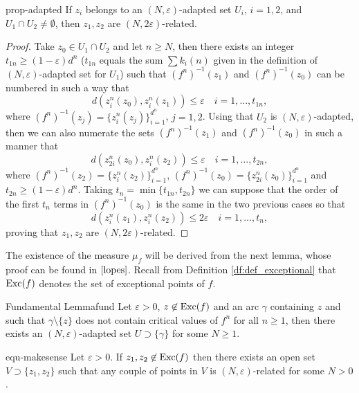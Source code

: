 \begin{myprop}{}{prop-adapted}
If $z_i$ belongs to an $(N,\varepsilon)$-adapted set $U_i$, $i=1,2$, and $U_1\cap U_2 \neq \emptyset$, then $z_1,z_2$ are $(N,2\varepsilon)$-related. 
\end{myprop}

\begin{proof}
Take $z_0 \in U_1\cap U_2$ and let $n\geq N$, then there exists an integer $t_{1n}\geq (1-\varepsilon)d^n$ ($t_{1n}$ equals the sum $\sum k_i(n)$ given in the definition of $(N,\varepsilon)$-adapted set for $U_1$) such that $(f^{n})^{-1}(z_1)$ and $(f^n)^{-1}(z_0)$ can be numbered in such a way that
$$d(z_i^n(z_0),z_i^n(z_1)) \leq \varepsilon \quad i=1,\dots,t_{1n},$$
where $(f^{n})^{-1}(z_j) = \{z_i^n(z_j)\}_{i=1}^{d^n}$, $j=1,2$. Using that $U_2$ is $(N,\varepsilon)$-adapted, then we can also numerate the sets $(f^{n})^{-1}(z_1)$ and $(f^n)^{-1}(z_0)$ in such a manner that
$$d(z_{2i}^n(z_0),z_i^n(z_2)) \leq \varepsilon \quad i=1,\dots,t_{2n},$$
where $(f^{n})^{-1}(z_2) = \{z_i^n(z_2)\}_{i=1}^{d^n}$, $(f^{n})^{-1}(z_0) = \{z_{2i}^n(z_0)\}_{i=1}^{d^n}$ and $t_{2n}\geq (1-\varepsilon)d^n$. Taking $t_n = \min\{t_{1n},t_{2n}\}$ we can suppose that the order of the first $t_n$ terms in $(f^n)^{-1}(z_0)$ is the same in the two previous cases so that
$$d(z_i^n(z_1),z_i^n(z_2)) \leq 2\varepsilon \quad i=1,\dots,t_{n},$$
proving that $z_1,z_2$ are $(N,2\varepsilon)$-related. 
\end{proof}

The existence of the measure $\mu_f$ will be derived from the next lemma, whose proof can be found in $\cite{lopes}$. Recall from Definition \ref{df:def_exceptional} that $\text{Exc}(f)$ denotes the set of exceptional points of $f$.

\begin{mylema}{Fundamental Lemma}{fund}
Let $\varepsilon>0$, $z\not \in \text{Exc}(f)$ and an arc $\gamma$ containing $z$ and such that $\gamma\setminus \{z\}$ does not contain critical values of $f^n$ for all $n\geq 1$, then there exists an $(N,\varepsilon)$-adapted set $U\supset \{\gamma\}$ for some $N\geq 1$.
\end{mylema}

\begin{mycoro}{}{equ-makesense}
Let $\varepsilon>0$. If $z_1,z_2\not \in \text{Exc}(f)$ then there exists an open set $V\supset\{z_1,z_2\}$ such that any couple of points in $V$ is $(N,\varepsilon)$-related for some $N>0$.
\end{mycoro}

